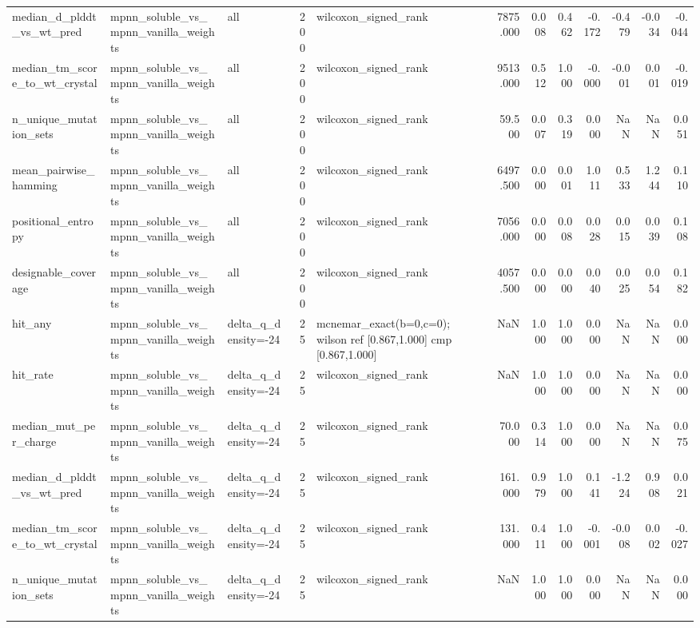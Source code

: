 \begin{table}
{\begin{tabular}{lllrlrrrrrrr}
median\_d\_plddt\_vs\_wt\_pred & mpnn\_soluble\_vs\_mpnn\_vanilla\_weights & all & 200 & wilcoxon\_signed\_rank & 7875.000 & 0.008 & 0.462 & -0.172 & -0.479 & -0.034 & -0.044 \\
median\_tm\_score\_to\_wt\_crystal & mpnn\_soluble\_vs\_mpnn\_vanilla\_weights & all & 200 & wilcoxon\_signed\_rank & 9513.000 & 0.512 & 1.000 & -0.000 & -0.001 & 0.001 & -0.019 \\
n\_unique\_mutation\_sets & mpnn\_soluble\_vs\_mpnn\_vanilla\_weights & all & 200 & wilcoxon\_signed\_rank & 59.500 & 0.007 & 0.319 & 0.000 & NaN & NaN & 0.051 \\
mean\_pairwise\_hamming & mpnn\_soluble\_vs\_mpnn\_vanilla\_weights & all & 200 & wilcoxon\_signed\_rank & 6497.500 & 0.000 & 0.001 & 1.011 & 0.533 & 1.244 & 0.110 \\
positional\_entropy & mpnn\_soluble\_vs\_mpnn\_vanilla\_weights & all & 200 & wilcoxon\_signed\_rank & 7056.000 & 0.000 & 0.008 & 0.028 & 0.015 & 0.039 & 0.108 \\
designable\_coverage & mpnn\_soluble\_vs\_mpnn\_vanilla\_weights & all & 200 & wilcoxon\_signed\_rank & 4057.500 & 0.000 & 0.000 & 0.040 & 0.025 & 0.054 & 0.182 \\
hit\_any & mpnn\_soluble\_vs\_mpnn\_vanilla\_weights & delta\_q\_density=-24 & 25 & mcnemar\_exact(b=0,c=0); wilson ref [0.867,1.000] cmp [0.867,1.000] & NaN & 1.000 & 1.000 & 0.000 & NaN & NaN & 0.000 \\
hit\_rate & mpnn\_soluble\_vs\_mpnn\_vanilla\_weights & delta\_q\_density=-24 & 25 & wilcoxon\_signed\_rank & NaN & 1.000 & 1.000 & 0.000 & NaN & NaN & 0.000 \\
median\_mut\_per\_charge & mpnn\_soluble\_vs\_mpnn\_vanilla\_weights & delta\_q\_density=-24 & 25 & wilcoxon\_signed\_rank & 70.000 & 0.314 & 1.000 & 0.000 & NaN & NaN & 0.075 \\
median\_d\_plddt\_vs\_wt\_pred & mpnn\_soluble\_vs\_mpnn\_vanilla\_weights & delta\_q\_density=-24 & 25 & wilcoxon\_signed\_rank & 161.000 & 0.979 & 1.000 & 0.141 & -1.224 & 0.908 & 0.021 \\
median\_tm\_score\_to\_wt\_crystal & mpnn\_soluble\_vs\_mpnn\_vanilla\_weights & delta\_q\_density=-24 & 25 & wilcoxon\_signed\_rank & 131.000 & 0.411 & 1.000 & -0.001 & -0.008 & 0.002 & -0.027 \\
n\_unique\_mutation\_sets & mpnn\_soluble\_vs\_mpnn\_vanilla\_weights & delta\_q\_density=-24 & 25 & wilcoxon\_signed\_rank & NaN & 1.000 & 1.000 & 0.000 & NaN & NaN & 0.000 \\

\end{tabular}}
\end{table}
